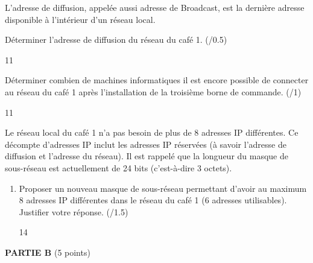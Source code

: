 \documentclass[a4paper,10pt]{report}
\begin{document}
    L'adresse de diffusion, appelée aussi adresse de Broadcast, est la dernière adresse disponible à l'intérieur d’un réseau local.
\begin{enumerate}[resume]

    \begin{minipage}{0.48\linewidth}
    \item Déterminer l'adresse de diffusion du réseau du café 1. (/0.5)
\end{minipage}\hfill
    \begin{minipage}{0.48\linewidth}
        \begin{answer}{1}{1}    \end{answer}
\end{minipage}

\begin{minipage}{0.48\linewidth}
    \item Déterminer combien de machines informatiques il est encore possible de connecter au réseau du café 1 après l'installation de la troisième borne de commande. (/1)
\end{minipage}\hfill
    \begin{minipage}{0.48\linewidth}
        \begin{answer}{1}{1}    \end{answer}
\end{minipage}
\end{enumerate}

\medskip

Le réseau local du café 1 n'a pas besoin de plus de 8 adresses IP différentes. Ce décompte d'adresses IP inclut les adresses IP réservées (à savoir l'adresse de diffusion et l'adresse du réseau). Il est rappelé que la longueur du masque de sous-réseau est actuellement de 24 bits (c'est-à-dire 3 octets).

\begin{enumerate}[resume]
\item Proposer un nouveau masque de sous-réseau permettant d'avoir au maximum 8 adresses IP différentes dans le réseau du café 1 (6 adresses utilisables). Justifier votre réponse. (/1.5)

        \begin{answer}{1}{4}    \end{answer}


\end{enumerate}


\bigskip

\textbf{PARTIE B} \dotfill (5 points)
\end{document}
